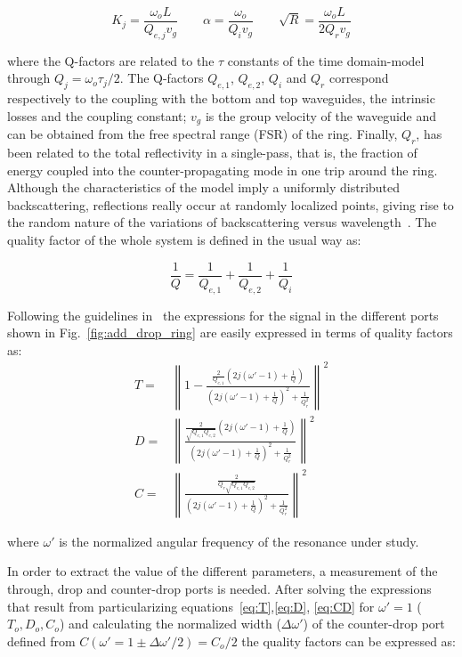 \documentclass[10pt,letterpaper]{article}
\begin{document}
\begin{equation}
    K_j=\frac{\omega_oL}{Q_{e,j} v_g}  \qquad \alpha=\frac{\omega_o}{Q_i v_g} \qquad \sqrt{R}=\frac{\omega_oL}{2Q_rv_g}
\label{eq:space-constants}
\end{equation}

where the Q-factors are related to the $\tau$ constants of the time domain-model through $Q_j=\omega_o \tau_j/2$. The Q-factors $Q_{e,1}$, $Q_{e,2}$, $Q_{i}$ and $Q_{r}$ correspond respectively to the coupling with the bottom and top waveguides, the intrinsic losses and the coupling constant; $v_g$ is the group velocity of the waveguide and can be obtained from the free spectral range (FSR) of the ring. Finally, $Q_r$, has been related to the total reflectivity in a single-pass, that is, the fraction of energy coupled into the counter-propagating mode in one trip around the ring. Although the characteristics of the model imply a uniformly distributed backscattering, reflections really occur at randomly localized points, giving rise to the random nature of the variations of backscattering versus wavelength~\cite{Morichetti2010}. The quality factor of the whole system is defined in the usual way as:

\begin{equation}
	    \frac{1}{Q}=\frac{1}{Q_{e,1}}+\frac{1}{Q_{e,2}}+\frac{1}{Q_i}
\end{equation}

Following the guidelines in~\cite{Haus1984,Little1997,Zhang2008} the expressions for the signal in the different ports shown in Fig.~\ref{fig:add_drop_ring} are easily expressed in terms of quality factors as:
\begin{align}
	T=& \left\lVert1-\frac{        \frac{2}{Q_{e,1}}(2j(\omega '-1)+\frac{1}{Q})   }  {   (2j(\omega '-1)+\frac{1}{Q})^2+\frac{1}{Q_r^2}  }\right\rVert^2 \label{eq:T} \\
	D =& \left\lVert\frac{          \frac{2}{\sqrt{Q_{e,1}Q_{e,2}}}(2j(\omega '-1)+\frac{1}{Q})   }  {   (2j(\omega'-1)+\frac{1}{Q})^2+\frac{1}{Q_r^2}    }\right\rVert^2 \label{eq:D} \\
	C=& \left\lVert\frac{          \frac{2}{Q_r\sqrt{Q_{e,1}Q_{e,2}}}   }  {   (2j(\omega'-1)+\frac{1}{Q})^2+\frac{1}{Q_r^2}    }\right\rVert^2 \label{eq:CD}
\end{align}

where $\omega'$ is the normalized angular frequency of the resonance under study.

In order to extract the value of the different parameters, a measurement of the through, drop and counter-drop ports is needed. After solving the expressions that result from particularizing equations~\ref{eq:T},\ref{eq:D}, \ref{eq:CD} for $\omega'=1$  ($T_o,D_o,C_o$) and calculating the normalized width ($\Delta\omega'$) of the counter-drop port defined from $C(\omega'=1\pm\Delta\omega'/2)=C_o/2$ the quality factors can be expressed as:
\end{document}
